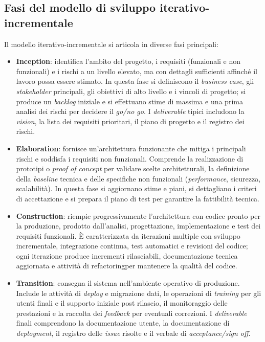 \subsection{Fasi del modello di sviluppo iterativo-incrementale}
Il modello iterativo-incrementale si articola in diverse fasi principali:
\begin{itemize}
\item \textbf {Inception}: identifica l'ambito del progetto, i requisiti (funzionali e non funzionali) e i rischi a un livello elevato, ma con dettagli sufficienti affinché il lavoro possa essere stimato. In questa fase si definiscono il \emph{business case}, gli \emph{stakeholder} principali, gli obiettivi di alto livello e i vincoli di progetto; si produce un \emph{backlog} iniziale e si effettuano stime di massima e una prima analisi dei rischi per decidere il \emph{go/no go}. I \emph{deliverable} tipici includono la \emph{vision}, la lista dei requisiti prioritari, il piano di progetto e il registro dei rischi.
\item \textbf {Elaboration}: fornisce un'architettura funzionante che mitiga i principali rischi e soddisfa i requisiti non funzionali. Comprende la realizzazione di prototipi o \emph{proof of concept} per validare scelte architetturali, la definizione della \emph{baseline} tecnica e delle specifiche non funzionali (\emph{performance}, sicurezza, scalabilità). In questa fase si aggiornano stime e piani, si dettagliano i criteri di accettazione e si prepara il piano di test per garantire la fattibilità tecnica.
\item \textbf {Construction}: riempie progressivamente l'architettura con codice pronto per la produzione, prodotto dall'analisi, progettazione, implementazione e test dei requisiti funzionali. È caratterizzata da iterazioni multiple con sviluppo incrementale, integrazione continua, test automatici e revisioni del codice; ogni iterazione produce incrementi rilasciabili, documentazione tecnica aggiornata e attività di \gls{refactoring}\glsfirstoccur per mantenere la qualità del codice.
\item \textbf {Transition}: consegna il sistema nell'ambiente operativo di produzione. Include le attività di \emph{deploy} e migrazione dati, le operazioni di \emph{training} per gli utenti finali e il supporto iniziale post rilascio, il monitoraggio delle prestazioni e la raccolta dei \emph{feedback} per eventuali correzioni. I \emph{deliverable} finali comprendono la documentazione utente, la documentazione di \emph{deployment}, il registro delle \emph{issue} risolte e il verbale di \emph{acceptance/sign off}.
\end{itemize}


